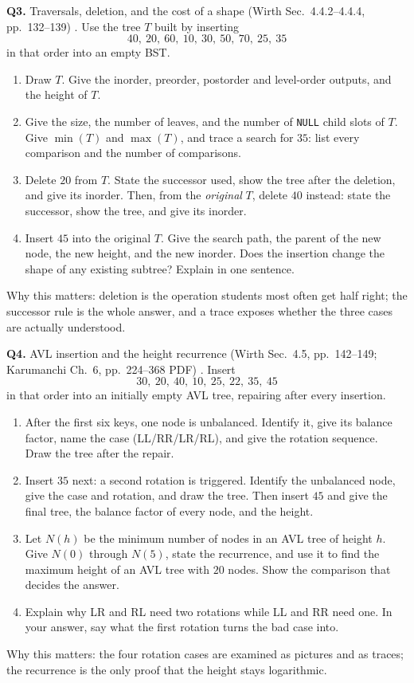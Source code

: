 \documentclass[11pt]{article}
\begin{document}
\textbf{Q3.} Traversals, deletion, and the cost of a shape (Wirth Sec.~4.4.2--4.4.4, pp.~132--139) \cite{Wirth2004_algorithms_data_structures}.
Use the tree $T$ built by inserting
\[
  40,\ 20,\ 60,\ 10,\ 30,\ 50,\ 70,\ 25,\ 35
\]
in that order into an empty BST.
\begin{enumerate}
  \item[(a)] Draw $T$. Give the inorder, preorder, postorder and level-order outputs, and the height of $T$.
  \item[(b)] Give the size, the number of leaves, and the number of \texttt{NULL} child slots of $T$. Give $\min(T)$ and $\max(T)$, and trace a search for $35$: list every comparison and the number of comparisons.
  \item[(c)] Delete $20$ from $T$. State the successor used, show the tree after the deletion, and give its inorder. Then, from the \emph{original} $T$, delete $40$ instead: state the successor, show the tree, and give its inorder.
  \item[(d)] Insert $45$ into the original $T$. Give the search path, the parent of the new node, the new height, and the new inorder. Does the insertion change the shape of any existing subtree? Explain in one sentence.
\end{enumerate}
Why this matters: deletion is the operation students most often get half right; the successor rule is the whole answer, and a trace exposes whether the three cases are actually understood.

\textbf{Q4.} AVL insertion and the height recurrence (Wirth Sec.~4.5, pp.~142--149; Karumanchi Ch.~6, pp.~224--368 PDF) \cite{Wirth2004_algorithms_data_structures,Karumanchi2017_data_structures_algorithms_made_easy}.
Insert
\[
  30,\ 20,\ 40,\ 10,\ 25,\ 22,\ 35,\ 45
\]
in that order into an initially empty AVL tree, repairing after every insertion.
\begin{enumerate}
  \item[(a)] After the first six keys, one node is unbalanced. Identify it, give its balance factor, name the case (LL/RR/LR/RL), and give the rotation sequence. Draw the tree after the repair.
  \item[(b)] Insert $35$ next: a second rotation is triggered. Identify the unbalanced node, give the case and rotation, and draw the tree. Then insert $45$ and give the final tree, the balance factor of every node, and the height.
  \item[(c)] Let $N(h)$ be the minimum number of nodes in an AVL tree of height $h$. Give $N(0)$ through $N(5)$, state the recurrence, and use it to find the maximum height of an AVL tree with $20$ nodes. Show the comparison that decides the answer.
  \item[(d)] Explain why LR and RL need two rotations while LL and RR need one. In your answer, say what the first rotation turns the bad case into.
\end{enumerate}
Why this matters: the four rotation cases are examined as pictures and as traces; the recurrence is the only proof that the height stays logarithmic.
\end{document}
